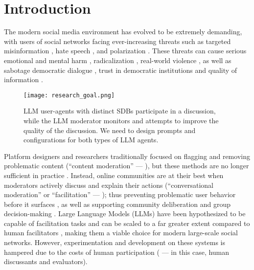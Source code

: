 %
\section{Introduction}
\label{sec:introduction}

The modern social media environment has evolved to be extremely demanding, with users of social networks facing ever-increasing threats such as targeted misinformation \cite{clemons2025disinformation, Denniss2025Social}, hate speech \cite{kolluri2025parler}, and polarization \cite{pranesh2024impactsocialmediapolarization}. These threats can cause serious emotional and mental harm \citep{proactive_moderation}, radicalization \citep{cho-etal-2024-language}, real-world violence \citep{schaffner_community_guidelines}, as well as sabotage democratic dialogue \citep{esau2017design, falk-etal-2021-predicting, seering_self_moderation}, trust in democratic institutions \citep{schroeder-etal-2024-fora} and quality of information \citep{make_reddit_great}.

\begin{figure}[t]
	\centering
	\texttt{[image: research\_goal.png]}
	\caption{LLM user-agents with distinct SDBs participate in a discussion, while the LLM moderator monitors and attempts to improve the quality of the discussion. We need to design prompts and configurations for both types of LLM agents.}
	\label{fig::goals}
\end{figure}


Platform designers and researchers traditionally focused on flagging and removing problematic content (``content moderation'' --- \citet{seering_self_moderation, cresci_pesonalized_interventions}), but these methods are no longer sufficient in practice \cite{horta_automated_moderation, schaffner_community_guidelines, small-polis-llm, korre2025evaluation}. Instead, online communities are at their best when moderators actively discuss and explain their actions (``conversational moderation'' or ``facilitation'' --- \citet{argyle2023, korre2025evaluation, falk-etal-2021-predicting}); thus preventing problematic user behavior before it surfaces \cite{cho-etal-2024-language, seering_self_moderation, cresci_pesonalized_interventions, make_reddit_great}, as well as supporting community deliberation and group decision-making \cite{kim_et_al_chatbot, seering_self_moderation}. Large Language Models (LLMs) have been hypothesized to be capable of facilitation tasks and can be scaled to a far greater extent compared to human facilitators \cite{korre2025evaluation, small-polis-llm}, making them a viable choice for modern large-scale social networks. However, experimentation and development on these systems is hampered due to the costs of human participation (\citet{rossi_2024} --- in this case, human discussants and evaluators). 


